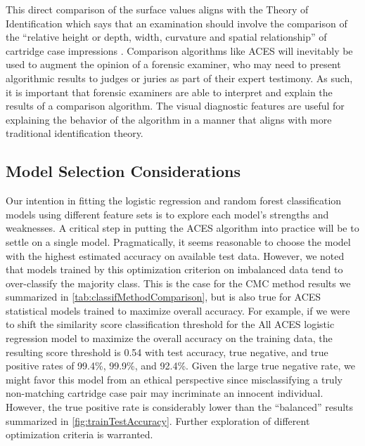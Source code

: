 \documentclass[reprint]{JASA}
\begin{document}
This direct comparison of the surface values aligns with the Theory of
Identification which says that an examination should involve the
comparison of the ``relative height or depth, width, curvature and
spatial relationship'' of cartridge case impressions \citep{AFTE1992}.
Comparison algorithms like ACES will inevitably be used to augment the
opinion of a forensic examiner, who may need to present algorithmic
results to judges or juries as part of their expert testimony. As such,
it is important that forensic examiners are able to interpret and
explain the results of a comparison algorithm. The visual diagnostic
features are useful for explaining the behavior of the algorithm in a
manner that aligns with more traditional identification theory.

\hypertarget{model-selection-considerations}{%
\subsection{Model Selection
Considerations}\label{model-selection-considerations}}

Our intention in fitting the logistic regression and random forest
classification models using different feature sets is to explore each
model's strengths and weaknesses. A critical step in putting the ACES
algorithm into practice will be to settle on a single model.
Pragmatically, it seems reasonable to choose the model with the highest
estimated accuracy on available test data. However, we noted that models
trained by this optimization criterion on imbalanced data tend to
over-classify the majority class. This is the case for the CMC method
results we summarized in \autoref{tab:classifMethodComparison}, but is
also true for ACES statistical models trained to maximize overall
accuracy. For example, if we were to shift the similarity score
classification threshold for the All ACES logistic regression model to
maximize the overall accuracy on the training data, the resulting score
threshold is 0.54 with test accuracy, true negative, and true positive
rates of 99.4\%, 99.9\%, and 92.4\%. Given the large true negative rate,
we might favor this model from an ethical perspective since
misclassifying a truly non-matching cartridge case pair may incriminate
an innocent individual. However, the true positive rate is considerably
lower than the ``balanced'' results summarized in
\autoref{fig:trainTestAccuracy}. Further exploration of different
optimization criteria is warranted.
\end{document}
